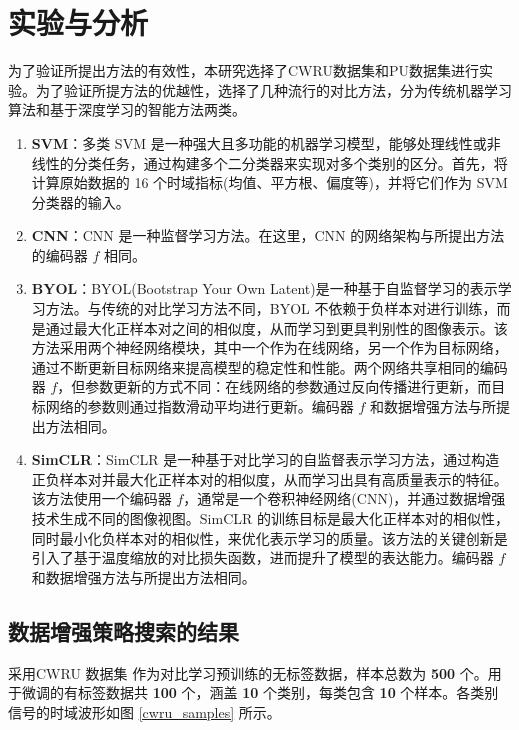 \documentclass[master]{thesis-uestc}
\begin{document}
\section{实验与分析}
为了验证所提出方法的有效性，本研究选择了CWRU数据集和PU数据集进行实验。为了验证所提方法的优越性，选择了几种流行的对比方法，分为传统机器学习算法和基于深度学习的智能方法两类。
\begin{enumerate}[label={(\arabic*)}]
    \item \textbf{SVM}：多类 SVM 是一种强大且多功能的机器学习模型，能够处理线性或非线性的分类任务，通过构建多个二分类器来实现对多个类别的区分。首先，将计算原始数据的 16 个时域指标(均值、平方根、偏度等)，并将它们作为 SVM 分类器的输入。

    \item \textbf{CNN}：CNN 是一种监督学习方法。在这里，CNN 的网络架构与所提出方法的编码器 \(f\) 相同。

    \item \textbf{BYOL}：BYOL(Bootstrap Your Own Latent)是一种基于自监督学习的表示学习方法。与传统的对比学习方法不同，BYOL 不依赖于负样本对进行训练，而是通过最大化正样本对之间的相似度，从而学习到更具判别性的图像表示。该方法采用两个神经网络模块，其中一个作为在线网络，另一个作为目标网络，通过不断更新目标网络来提高模型的稳定性和性能。两个网络共享相同的编码器 \(f\)，但参数更新的方式不同：在线网络的参数通过反向传播进行更新，而目标网络的参数则通过指数滑动平均进行更新。编码器 \(f\) 和数据增强方法与所提出方法相同。
    
    \item \textbf{SimCLR}：SimCLR 是一种基于对比学习的自监督表示学习方法，通过构造正负样本对并最大化正样本对的相似度，从而学习出具有高质量表示的特征。该方法使用一个编码器 \(f\)，通常是一个卷积神经网络(CNN)，并通过数据增强技术生成不同的图像视图。SimCLR 的训练目标是最大化正样本对的相似性，同时最小化负样本对的相似性，来优化表示学习的质量。该方法的关键创新是引入了基于温度缩放的对比损失函数，进而提升了模型的表达能力。编码器 \(f\) 和数据增强方法与所提出方法相同。

\end{enumerate}
\FloatBarrier  %
\subsection{数据增强策略搜索的结果}
\label{sec:CMA-ES_result}

采用CWRU 数据集 作为对比学习预训练的无标签数据，样本总数为 \textbf{500} 个。用于微调的有标签数据共 \textbf{100} 个，涵盖 \textbf{10} 个类别，每类包含 \textbf{10} 个样本。各类别信号的时域波形如图 \ref{cwru_samples} 所示。
\end{document}
